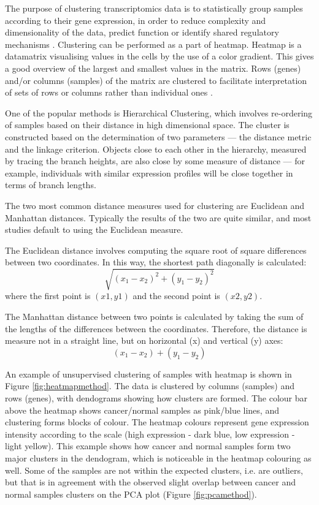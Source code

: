     The purpose of clustering transcriptomics data is to statistically group samples according to their gene expression, in order to reduce complexity and dimensionality of the data, predict function or identify shared regulatory mechanisms \cite{Metsalu2015ClustVis:Heatmap}. Clustering can be performed as a part of heatmap. Heatmap is a datamatrix visualising values in the cells by the use of a color gradient. This gives a good overview of the largest and smallest values in the matrix. Rows (genes) and/or columns (samples) of the matrix are clustered to facilitate interpretation of sets of rows or columns rather than individual ones \cite{Metsalu2015ClustVis:Heatmap}.
    
    \newpage
    One of the popular methods is Hierarchical Clustering, which involves re-ordering of samples based on their distance in high dimensional space. The cluster is constructed based on the determination of two parameters — the distance metric and the linkage criterion. Objects close to each other in the hierarchy, measured by tracing the branch heights, are also close by some measure of distance — for example, individuals with similar expression profiles will be close together in terms of branch lengths.
    
    
    The two most common distance measures used for clustering are Euclidean and Manhattan distances. Typically the results of the two are quite similar, and most studies default to using the Euclidean measure. 
    
    The Euclidean distance involves computing the square root of square differences between two coordinates. In this way, the shortest path diagonally is calculated: $$ \sqrt{(x_{1}-x_{2})^{2}+(y_{1}-y_{2})^{2}}$$ where the first point is $(x1, y1)$ and the second point is $(x2, y2).$
    
    The Manhattan distance between two points is calculated by taking the sum of the lengths of the differences between the coordinates. Therefore, the distance is measure not in a straight line, but on horizontal (x) and vertical (y) axes: $$ (x_{1}-x_{2})+(y_{1}-y_{2})$$
    

   An example of unsupervised clustering of samples with heatmap is shown in Figure \ref{fig:heatmapmethod}. The data is clustered by columns (samples) and rows (genes), with dendograms showing how clusters are formed. The colour bar above the heatmap shows cancer/normal samples as pink/blue lines, and clustering forms blocks of colour. The heatmap colours  represent gene expression intensity according to the scale (high expression - dark blue, low expression - light yellow). 
   This example shows how cancer and normal samples form two major clusters in the dendogram, which is noticeable in the heatmap colouring as well. Some of the samples are not within the expected clusters, i.e. are outliers, but that is in agreement with the observed  slight overlap between cancer and normal samples clusters on the PCA plot (Figure \ref{fig:pcamethod}).

